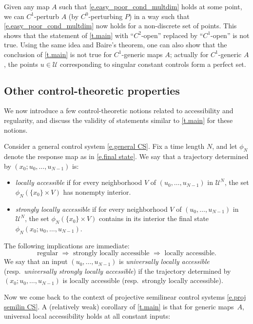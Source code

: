 \documentclass[10pt, a4paper]{amsart}
\theoremstyle{plain}
\theoremstyle{definition}
\theoremstyle{remark}
\theoremstyle{note}
\numberwithin{equation}{section}
\begin{document}
Given any map $A$ such that \eqref{e.easy_poor_cond_multdim} holds at some point,
we can $C^1$-perturb $A$ (by $C^0$-perturbing $P$) in a way such that \eqref{e.easy_poor_cond_multdim} now holds for a non-discrete set of points.
This shows that the statement of \cref{t.main} with ``$C^2$-open'' replaced by ``$C^1$-open'' is not true.
Using the same idea and Baire's theorem, one can also show that the conclusion of \cref{t.main} is not true for $C^1$-generic maps $A$; actually for $C^1$-generic $A$, the points $u \in {\mathcal{U}}$ corresponding to singular constant controls form a perfect set.

\subsection{Other control-theoretic properties}

We now introduce a few control-theoretic notions related to accessibility and regularity,
and discuss the validity of statements similar to \cref{t.main} for these notions.

Consider a general control system \eqref{e.general CS}.
Fix a time length $N$, and let $\phi_N$ denote the response map as in \eqref{e.final state}.
We say that a trajectory determined by $(x_0; u_0, \dots, u_{N-1})$ is:
\begin{itemize}
\item \emph{locally accessible} 
if for every neighborhood $V$ of $(u_0, \dots, u_{N-1})$ in ${\mathcal{U}}^N$,
the set $\phi_N(\{x_0\} \times V)$ has nonempty interior.
\item \emph{strongly locally accessible} if for every neighborhood $V$ of $(u_0, \dots, u_{N-1})$ in ${\mathcal{U}}^N$, the set $\phi_N(\{x_0\} \times V)$ contains in its interior the final state $\phi_N(x_0;u_0,\dots,u_{N-1})$.
\end{itemize}
The following implications are immediate:
$$
\text{regular $\Rightarrow$ strongly locally accessible $\Rightarrow$ locally accessible.}
$$
We say that an input $(u_0, \dots, u_{N-1})$ is \emph{universally locally accessible} 
(resp.\ \emph{universally strongly locally accessible}) if the trajectory determined by  
$(x_0; u_0, \dots, u_{N-1})$ is locally accessible (resp.\ strongly locally accessible). 

Now we come back to the context of 
projective semilinear control systems \eqref{e.proj semilin CS}.
A (relatively weak) corollary of \cref{t.main} is
that for generic maps~$A$, universal local accessibility holds at all 
constant inputs:
\end{document}
